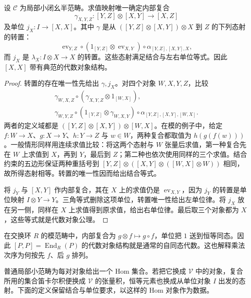 \begin{proposition}\label{b4:prop:closed-internal-composition}
	设 \(\mathcal C\) 为局部小闭幺半范畴。求值映射唯一确定内部复合
	\[
		\gamma_{X,Y,Z}:[Y,Z]\otimes[X,Y]\longrightarrow[X,Z]
	\]
	及单位 \(j_X:I\to[X,X]\)。其中 \(\gamma\) 是从 \(([Y,Z]\otimes[X,Y])\otimes X\) 到 \(Z\) 的下列态射的转置：
	\[
		\operatorname{ev}_{Y,Z}\circ (1_{[Y,Z]}\otimes\operatorname{ev}_{X,Y})\circ \alpha_{[Y,Z],[X,Y],X},
	\]
	而 \(j_X\) 是 \(\lambda_X:I\otimes X\to X\) 的转置。这些态射满足结合与左右单位等式。因此 \([X,X]\) 带有典范的代数对象结构。
\end{proposition}
\begin{proof}
	转置的存在唯一性先给出 \(\gamma,j_X\)。对四个对象 \(W,X,Y,Z\)，比较
	\[
		\begin{gathered}
			\gamma_{W,X,Z}\circ(\gamma_{X,Y,Z}\otimes1_{[W,X]}),\\
			\gamma_{W,Y,Z}\circ(1_{[Y,Z]}\otimes\gamma_{W,X,Y}) \circ\alpha_{[Y,Z],[X,Y],[W,X]}.
		\end{gathered}
	\]
	两者的定义域都是 \(([Y,Z]\otimes[X,Y])\otimes[W,X]\)。在模的例子中，给定 \(f:W\to X\)、\(g:X\to Y\)、\(h:Y\to Z\) 与 \(w\in W\)，两种复合都取值为 \(h(g(f(w)))\)。一般情形同样用连续求值比较：将这两个态射与 \(W\) 张量后求值，第一种复合先在 \(W\) 上求值到 \(X\)，再到 \(Y\)，最后到 \(Z\)；第二种也依次使用同样的三个求值。结合约束的五边形保证两种重括号到 \([Y,Z]\otimes([X,Y]\otimes([W,X]\otimes W))\) 相同，故所得态射相等。转置的唯一性因而给出结合等式。

	将 \(j_Y\) 与 \([X,Y]\) 作内部复合，其在 \(X\) 上的求值仍是 \(\operatorname{ev}_{X,Y}\)，因为 \(j_Y\) 的转置是单位映射 \(I\otimes Y\to Y\)。三角等式删除这项单位，转置唯一性给出左单位律。将 \(j_X\) 放在另一侧，同样在 \(X\) 上求值得到原求值，给出右单位律。最后取三个对象都为 \(X\)，这些等式就是代数对象公理。
\end{proof}

在交换环 \(R\) 的模范畴中，内部复合为 \(g\otimes f\mapsto g\circ f\)，单位把 \(1\) 送到恒等同态。因此 \([P,P]=\operatorname{End}_R(P)\) 的代数对象结构就是通常的自同态代数。这也解释乘法次序为何按先 \(f\)、后 \(g\) 排列。

普通局部小范畴为每对对象给出一个 Hom 集合。若把它换成 \(\mathcal V\) 中的对象，复合所用的集合笛卡尔积便换成 \(\mathcal V\) 的张量积，恒等元素也换成从单位对象 \(I\) 出发的态射。下面的定义保留结合与单位要求，以这样的 Hom 对象作为数据。


